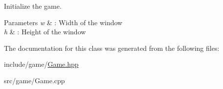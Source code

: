 Initialize the game. 


\begin{DoxyParams}{Parameters}
{\em w} & \+: Width of the window \\
\hline
{\em h} & \+: Height of the window \\
\hline
\end{DoxyParams}


The documentation for this class was generated from the following files\+:\begin{DoxyCompactItemize}
\item 
include/game/\hyperlink{Game_8hpp}{Game.\+hpp}\item 
src/game/Game.\+cpp\end{DoxyCompactItemize}
